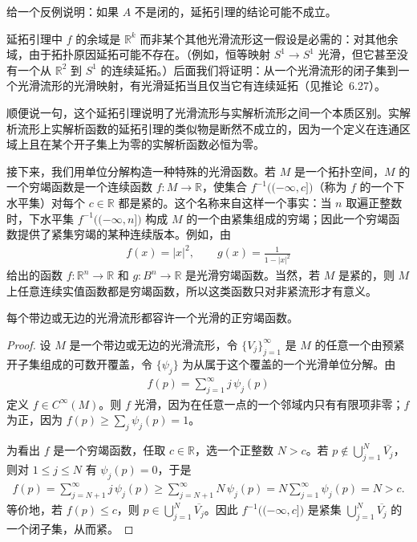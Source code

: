 \documentclass[../../main.tex]{subfiles}
\begin{document}
\begin{exercise}\label{exercise:ch02-2.27}
给一个反例说明：如果 $A$ 不是闭的，延拓引理的结论可能不成立。
\end{exercise}

延拓引理中 $f$ 的余域是 $\mathbb{R}^{k}$ 而非某个其他光滑流形这一假设是必需的：对其他余域，由于拓扑原因延拓可能不存在。（例如，恒等映射 $S^{1}\to S^{1}$ 光滑，但它甚至没有一个从 $\mathbb{R}^{2}$ 到 $S^{1}$ 的连续延拓。）后面我们将证明：从一个光滑流形的闭子集到一个光滑流形的光滑映射，有光滑延拓当且仅当它有连续延拓（见推论~6.27）。

顺便说一句，这个延拓引理说明了光滑流形与实解析流形之间一个本质区别。实解析流形上实解析函数的延拓引理的类似物是断然不成立的，因为一个定义在连通区域上且在某个开子集上为零的实解析函数必恒为零。

接下来，我们用单位分解构造一种特殊的光滑函数。若 $M$ 是一个拓扑空间，$M$ 的一个穷竭函数是一个连续函数 $f:M\to\mathbb{R}$，使集合 $f^{-1}\bigl((-\infty,c]\bigr)$（称为 $f$ 的一个下水平集）对每个 $c\in\mathbb{R}$ 都是紧的。这个名称来自这样一个事实：当 $n$ 取遍正整数时，下水平集 $f^{-1}\bigl((-\infty,n]\bigr)$ 构成 $M$ 的一个由紧集组成的穷竭；因此一个穷竭函数提供了紧集穷竭的某种连续版本。例如，由
\begin{align*}
f(x)=|x|^{2},\qquad g(x)=\frac{1}{1-|x|^{2}}
\end{align*}
给出的函数 $f:\mathbb{R}^{n}\to\mathbb{R}$ 和 $g:B^{n}\to\mathbb{R}$ 是光滑穷竭函数。当然，若 $M$ 是紧的，则 $M$ 上任意连续实值函数都是穷竭函数，所以这类函数只对非紧流形才有意义。

\begin{proposition}[光滑穷竭函数的存在性]\label{proposition:ch02-光滑穷竭函数}
每个带边或无边的光滑流形都容许一个光滑的正穷竭函数。
\end{proposition}

\begin{proof}
设 $M$ 是一个带边或无边的光滑流形，令 $\{V_{j}\}_{j=1}^{\infty}$ 是 $M$ 的任意一个由预紧开子集组成的可数开覆盖，令 $\{\psi_{j}\}$ 为从属于这个覆盖的一个光滑单位分解。由
\begin{align*}
f(p)=\sum_{j=1}^{\infty}j\,\psi_{j}(p)
\end{align*}
定义 $f\in C^{\infty}(M)$。则 $f$ 光滑，因为在任意一点的一个邻域内只有有限项非零；$f$ 为正，因为 $f(p)\geqslant\sum_{j}\psi_{j}(p)=1$。

为看出 $f$ 是一个穷竭函数，任取 $c\in\mathbb{R}$，选一个正整数 $N>c$。若 $p\notin\bigcup_{j=1}^{N}\overline{V_{j}}$，则对 $1\leqslant j\leqslant N$ 有 $\psi_{j}(p)=0$，于是
\begin{align*}
f(p)=\sum_{j=N+1}^{\infty}j\,\psi_{j}(p)\geqslant\sum_{j=N+1}^{\infty}N\,\psi_{j}(p)=N\sum_{j=1}^{\infty}\psi_{j}(p)=N>c.
\end{align*}
等价地，若 $f(p)\leqslant c$，则 $p\in\bigcup_{j=1}^{N}\overline{V_{j}}$。因此 $f^{-1}\bigl((-\infty,c]\bigr)$ 是紧集 $\bigcup_{j=1}^{N}\overline{V_{j}}$ 的一个闭子集，从而紧。
\end{proof}
\end{document}
